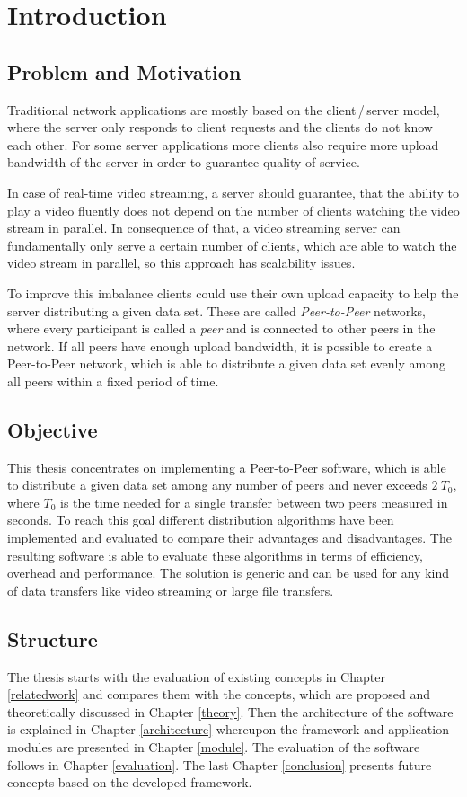 
\chapter{Introduction}
\section{Problem and Motivation}
Traditional network applications are mostly based on the client\,/\,server model, where the server only responds to client requests and the clients do not know each other. 
For some server applications more clients also require more upload bandwidth of the server in order to guarantee quality of service.

In case of real-time video streaming, a server should guarantee, that the ability to play a video fluently does not depend on the number of clients watching the video stream in parallel. In consequence of that, a video streaming server can fundamentally only serve a certain number of clients, which are able to watch the video stream in parallel, so this approach has scalability issues.

To improve this imbalance clients could use their own upload capacity to help the server distributing a given data set. These are called \emph{Peer-to-Peer} networks, where every participant is called a \emph{peer} and is connected to other peers in the network.  If all peers have enough upload bandwidth, it is possible to create a Peer-to-Peer network, which is able to distribute a given data set evenly among all peers within a fixed period of time.

\section{Objective}
This thesis concentrates on implementing a Peer-to-Peer software, which is able to distribute a given data set among any number of peers and never exceeds $2\:T_0$, where $T_0$ is the time needed for a single transfer between two peers measured in seconds. To reach this goal different distribution algorithms have been implemented and evaluated to compare their advantages and disadvantages. The resulting software is able to evaluate these algorithms in terms of efficiency, overhead and performance. The solution is generic and can be used for any kind of data transfers like video streaming or large file transfers.

\section{Structure}
The thesis starts with the evaluation of existing concepts in Chapter \ref{relatedwork} and compares them with the concepts, which are proposed and theoretically discussed in Chapter \ref{theory}. Then the architecture of the software is explained in Chapter \ref{architecture} whereupon the framework and application modules are presented in Chapter \ref{module}. The evaluation of the software follows in Chapter \ref{evaluation}. The last Chapter \ref{conclusion} presents future concepts based on the developed framework.